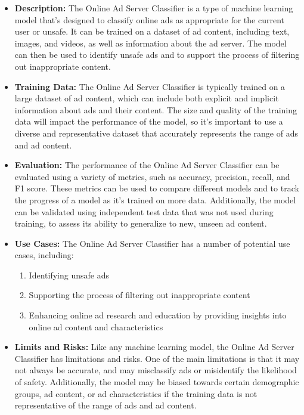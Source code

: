 \begin{itemize}
\begin{itemize}
    \item \textbf{Description:} The Online Ad Server Classifier is a type of machine learning model that's designed to classify online ads as appropriate for the current user or unsafe. It can be trained on a dataset of ad content, including text, images, and videos, as well as information about the ad server. The model can then be used to identify unsafe ads and to support the process of filtering out inappropriate content.
    \item \textbf{Training Data:} The Online Ad Server Classifier is typically trained on a large dataset of ad content, which can include both explicit and implicit information about ads and their content. The size and quality of the training data will impact the performance of the model, so it's important to use a diverse and representative dataset that accurately represents the range of ads and ad content.
    \item \textbf{Evaluation:} The performance of the Online Ad Server Classifier can be evaluated using a variety of metrics, such as accuracy, precision, recall, and F1 score. These metrics can be used to compare different models and to track the progress of a model as it's trained on more data. Additionally, the model can be validated using independent test data that was not used during training, to assess its ability to generalize to new, unseen ad content.
    \item \textbf{Use Cases:} The Online Ad Server Classifier has a number of potential use cases, including:
        \begin{enumerate}  
            \item Identifying unsafe ads
            \item Supporting the process of filtering out inappropriate content
            \item Enhancing online ad research and education by providing insights into online ad content and characteristics
        \end{enumerate}
    \item \textbf{Limits and Risks:} Like any machine learning model, the Online Ad Server Classifier has limitations and risks. One of the main limitations is that it may not always be accurate, and may misclassify ads or misidentify the likelihood of safety. Additionally, the model may be biased towards certain demographic groups, ad content, or ad characteristics if the training data is not representative of the range of ads and ad content.

\end{itemize}
\end{itemize}
